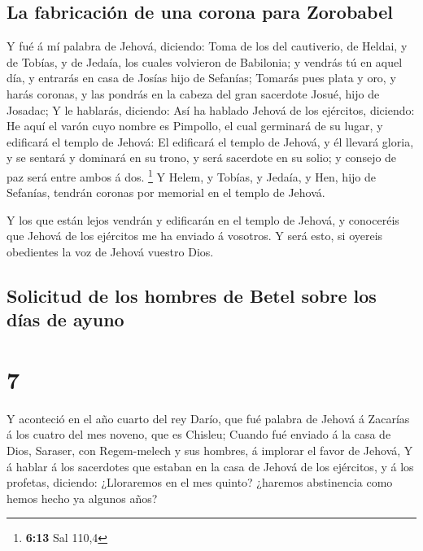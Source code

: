 \hypertarget{la-fabricaciuxf3n-de-una-corona-para-zorobabel}{%
\subsection{La fabricación de una corona para
Zorobabel}\label{la-fabricaciuxf3n-de-una-corona-para-zorobabel}}

 Y fué á mí palabra de Jehová, diciendo:  Toma
de los del cautiverio, de Heldai, y de Tobías, y de Jedaía, los cuales
volvieron de Babilonia; y vendrás tú en aquel día, y entrarás en casa de
Josías hijo de Sefanías;  Tomarás pues plata y oro, y harás
coronas, y las pondrás en la cabeza del gran sacerdote Josué, hijo de
Josadac;  Y le hablarás, diciendo: Así ha hablado Jehová de
los ejércitos, diciendo: He aquí el varón cuyo nombre es Pimpollo, el
cual germinará de su lugar, y edificará el templo de Jehová:
 El edificará el templo de Jehová, y él llevará gloria, y
se sentará y dominará en su trono, y será sacerdote en su solio; y
consejo de paz será entre ambos á dos. \footnote{\textbf{6:13} Sal 110,4}
 Y Helem, y Tobías, y Jedaía, y Hen, hijo de Sefanías,
tendrán coronas por memorial en el templo de Jehová.

 Y los que están lejos vendrán y edificarán en el templo de
Jehová, y conoceréis que Jehová de los ejércitos me ha enviado á
vosotros. Y será esto, si oyereis obedientes la voz de Jehová vuestro
Dios.

\hypertarget{solicitud-de-los-hombres-de-betel-sobre-los-duxedas-de-ayuno}{%
\subsection{Solicitud de los hombres de Betel sobre los días de
ayuno}\label{solicitud-de-los-hombres-de-betel-sobre-los-duxedas-de-ayuno}}

\hypertarget{section-6}{%
\section{7}\label{section-6}}

 Y aconteció en el año cuarto del rey Darío, que fué palabra
de Jehová á Zacarías á los cuatro del mes noveno, que es Chisleu;
 Cuando fué enviado á la casa de Dios, Saraser, con
Regem-melech y sus hombres, á implorar el favor de Jehová, 
Y á hablar á los sacerdotes que estaban en la casa de Jehová de los
ejércitos, y á los profetas, diciendo: ¿Lloraremos en el mes quinto?
¿haremos abstinencia como hemos hecho ya algunos años?

